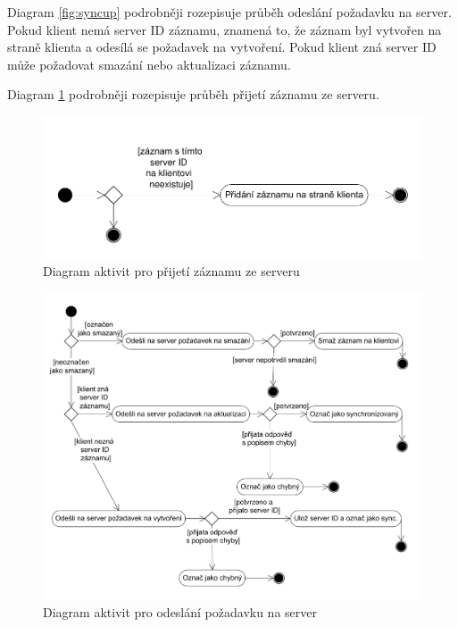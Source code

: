 \documentclass{diplomka}
\begin{document}
Diagram \ref{fig:syncup} podrobněji rozepisuje průběh odeslání požadavku na server. Pokud klient nemá server ID záznamu, znamená to, že záznam byl vytvořen na straně klienta a odesílá se požadavek na vytvoření. Pokud klient zná server ID může požadovat smazání nebo aktualizaci záznamu. 

Diagram \ref{fig:syncdown} podrobněji rozepisuje průběh přijetí záznamu ze serveru.
\begin{figure}[H]
  \centering
  \includegraphics[scale=0.7]{visio/syncdown.pdf}
\caption{Diagram aktivit pro přijetí záznamu ze serveru}
\label{fig:syncdown}
\end{figure}

\begin{figure}[H]
  \centering
  \includegraphics[scale=0.7]{visio/syncup.pdf}
\caption{Diagram aktivit pro odeslání požadavku na server}
\label{obr:syncup}
\end{figure}
\vspace{-8mm}
\end{document}
